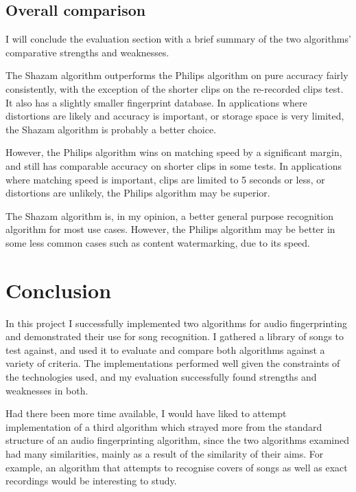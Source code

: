 \documentclass[12pt,a4paper,twoside,openright]{report}
\begin{document}
\section{Overall comparison}

I will conclude the evaluation section with a brief summary of the two algorithms' comparative strengths and weaknesses.

The Shazam algorithm outperforms the Philips algorithm on pure accuracy fairly consistently, with the exception of the shorter clips on the re-recorded clips test. It also has a slightly smaller fingerprint database. In applications where distortions are likely and accuracy is important, or storage space is very limited, the Shazam algorithm is probably a better choice.

However, the Philips algorithm wins on matching speed by a significant margin, and still has comparable accuracy on shorter clips in some tests. In applications where matching speed is important, clips are limited to 5 seconds or less, or distortions are unlikely, the Philips algorithm may be superior. 

The Shazam algorithm is, in my opinion, a better general purpose recognition algorithm for most use cases. However, the Philips algorithm may be better in some less common cases such as content watermarking, due to its speed.



\chapter{Conclusion}
\label{conclusion}

In this project I successfully implemented two algorithms for audio fingerprinting and demonstrated their use for song recognition. I gathered a library of songs to test against, and used it to evaluate and compare both algorithms against a variety of criteria. The implementations performed well given the constraints of the technologies used, and my evaluation successfully found strengths and weaknesses in both.

Had there been more time available, I would have liked to attempt implementation of a third algorithm which strayed more from the standard structure of an audio fingerprinting algorithm, since the two algorithms examined had many similarities, mainly as a result of the similarity of their aims. For example, an algorithm that attempts to recognise covers of songs as well as exact recordings would be interesting to study.
\end{document}

